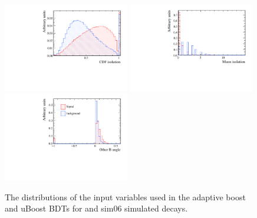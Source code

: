 \begin{figure}[htbp]
    \includegraphics[width=0.49\textwidth]{./Figs/Appendix2/CDF.pdf}
    \includegraphics[width=0.49\textwidth]{./Figs/Appendix2/muon_iso.pdf}
    \includegraphics[width=0.49\textwidth]{./Figs/Appendix2/B_other_angle.pdf}
  \caption{The distributions of the input variables used in the adaptive boost and uBoost BDTs for \bsmumu and  sim06 simulated decays.}
  \label{fig:myBDTvars}
\end{figure}




